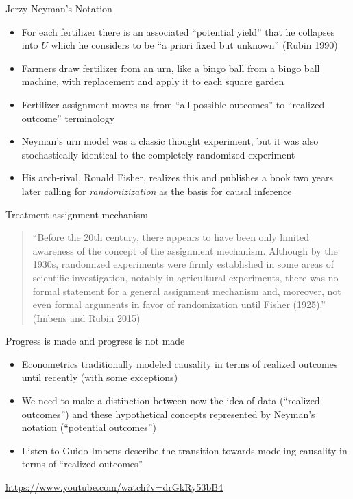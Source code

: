 \documentclass{beamer}
\begin{document}
\begin{frame}{Jerzy Neyman's Notation}

\begin{itemize}

\item For each fertilizer there is an associated ``potential yield'' that he collapses into $U$ which he considers to be ``a priori fixed but unknown'' (Rubin 1990)
\item Farmers draw fertilizer from an urn, like a bingo ball from a bingo ball machine, with replacement and apply it to each square garden
\item Fertilizer assignment moves us from ``all possible outcomes'' to ``realized outcome'' terminology
\item Neyman's urn model was a classic thought experiment, but it was also stochastically identical to the completely randomized experiment
\item His arch-rival, Ronald Fisher, realizes this and publishes a book two years later calling for \emph{randomizization} as the basis for causal inference
\end{itemize}

\end{frame}

\begin{frame}{Treatment assignment mechanism}

\begin{quote}

``Before the 20th century, there appears to have been only limited awareness of the concept of the assignment mechanism.  Although by the 1930s, randomized experiments were firmly established in some areas of scientific investigation, notably in agricultural experiments, there was no formal statement for a general assignment mechanism and, moreover, not even formal arguments in favor of randomization until Fisher (1925).'' (Imbens and Rubin 2015)

\end{quote}

\end{frame}

\begin{frame}{Progress is made and progress is not made}

\begin{itemize}

\item Econometrics traditionally modeled causality in terms of realized outcomes until recently (with some exceptions)
\item We need to make a distinction between now the idea of data (``realized outcomes'') and these hypothetical concepts represented by Neyman's notation (``potential outcomes'')
\item Listen to Guido Imbens describe the transition towards modeling causality in terms of ``realized outcomes''

\end{itemize}

\bigskip

\url{https://www.youtube.com/watch?v=drGkRy53bB4}

\end{frame}
\end{document}
